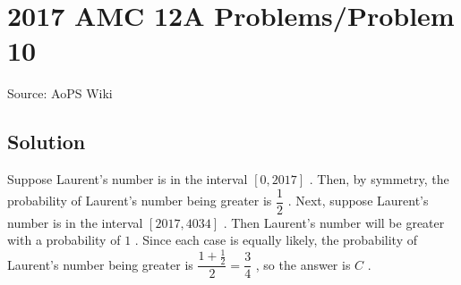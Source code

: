 \documentclass[12pt]{article}
\begin{document}
\section*{{2017 AMC 12A Problems/Problem 10}}
Source: AoPS Wiki

\subsection*{Solution}
Suppose Laurent's number is in the interval $[ 0, 2017 ]$ . Then, by symmetry, the probability of Laurent's number being greater is $\dfrac{1}{2}$ . Next, suppose Laurent's number is in the interval $[ 2017, 4034 ]$ . Then Laurent's number will be greater with a probability of $1$ . Since each case is equally likely, the probability of Laurent's number being greater is $\dfrac{1 + \frac{1}{2}}{2} = \dfrac{3}{4}$ , so the answer is $\boxed{C}$ .
\end{document}

